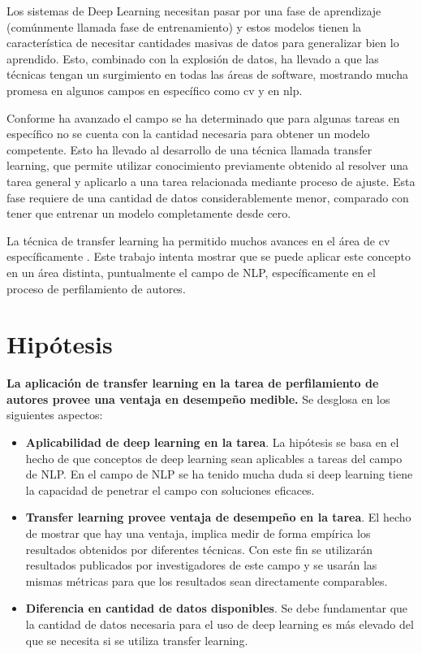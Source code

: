 Los sistemas de Deep Learning necesitan pasar por una fase de aprendizaje (comúnmente llamada fase de \gls{entrenamiento}) y estos modelos tienen la característica de necesitar cantidades masivas de datos para generalizar bien lo aprendido. Esto, combinado con la explosión de datos, ha llevado a que las técnicas tengan un surgimiento en todas las áreas de software, mostrando mucha promesa en algunos campos en específico como \gls{cv} \parencite{hoo2016deep} y en \gls{nlp}.

Conforme ha avanzado el campo se ha determinado que para algunas tareas en específico no se cuenta con la cantidad necesaria para obtener un modelo competente. Esto ha llevado al desarrollo de una técnica llamada transfer learning, que permite utilizar conocimiento previamente obtenido al resolver una tarea general y aplicarlo a una tarea relacionada mediante proceso de ajuste. Esta fase requiere de una cantidad de datos considerablemente menor, comparado con tener que entrenar un modelo completamente desde cero.

La técnica de transfer learning ha permitido muchos avances en el área de \gls{cv} específicamente \parencite{hoo2016deep}. Este trabajo intenta mostrar que se puede aplicar este concepto en un área distinta, puntualmente el campo de NLP, específicamente en el proceso de \gls{perfilamiento de autores}.

\section{Hipótesis}

\textbf{La aplicación de transfer learning en la tarea de perfilamiento de autores provee una ventaja en desempeño medible.} Se desglosa en los siguientes aspectos:

\begin{itemize}
\item \textbf{Aplicabilidad de deep learning en la tarea}. La hipótesis se basa en el hecho de que conceptos de deep learning sean aplicables a tareas del campo de NLP. En el campo de NLP se ha tenido mucha duda si deep learning tiene la capacidad de penetrar el campo con soluciones eficaces.

\item \textbf{Transfer learning provee ventaja de desempeño en la tarea}. El hecho de mostrar que hay una ventaja, implica medir de forma empírica los resultados obtenidos por diferentes técnicas. Con este fin se utilizarán resultados publicados por investigadores de este campo y se usarán las mismas métricas para que los resultados sean directamente comparables.

\item \textbf{Diferencia en cantidad de datos disponibles}. Se debe fundamentar que la cantidad de datos necesaria para el uso de deep learning es más elevado del que se necesita si se utiliza transfer learning.
\end{itemize}

